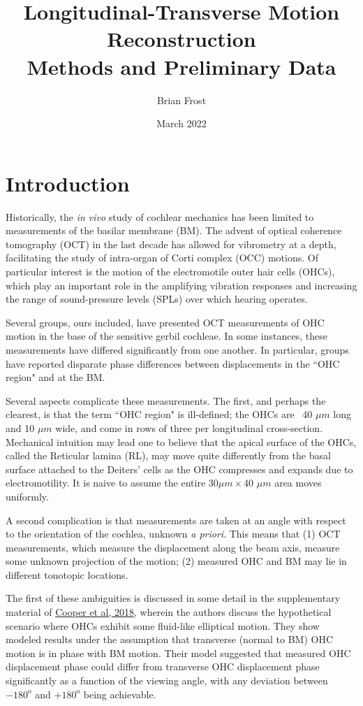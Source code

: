\documentclass{article}
\title{Longitudinal-Transverse Motion Reconstruction \\ Methods and Preliminary Data}
\author{Brian Frost}
\date{March 2022}
\begin{document}
\maketitle

\section{Introduction}
\par{Historically, the \textit{in vivo} study of cochlear mechanics has been limited to measurements of the basilar membrane (BM). The advent of optical coherence tomography (OCT) in the last decade has allowed for vibrometry at a depth, facilitating the study of intra-organ of Corti complex (OCC) motions. Of particular interest is the motion of the electromotile outer hair cells (OHCs), which play an important role in the amplifying vibration responses and increasing the range of sound-pressure levels (SPLs) over which hearing operates.}
\par{Several groups, ours included, have presented OCT measurements of OHC motion in the base of the sensitive gerbil cochleae. In some instances, these measurements have differed significantly from one another. In particular, groups have reported disparate phase differences between displacements in the ``OHC region" and at the BM.}
\par{Several aspects complicate these measurements. The first, and perhaps the clearest, is that the term ``OHC region" is ill-defined; the OHCs are ~40 $\mu m$ long and 10 $\mu m$ wide, and come in rows of three per longitudinal cross-section. Mechanical intuition may lead one to believe that the apical surface of the OHCs, called the Reticular lamina (RL), may move quite differently from the basal surface attached to the Deiters' cells as the OHC compresses and expands due to electromotility. It is naive to assume the entire 30$\mu m\times$40 $\mu m$ area moves uniformly.}
\par{A second complication is that measurements are taken at an angle with respect to the orientation of the cochlea, unknown \textit{a priori}. This means that (1) OCT measurements, which measure the displacement along the beam axis, measure some unknown projection of the motion; (2) measured OHC and BM may lie in different tonotopic locations.}
\par{The first of these ambiguities is discussed in some detail in the supplementary material of \href{https://www.nature.com/articles/s41467-018-05483-z}{Cooper et al, 2018}, wherein the authors discuss the hypothetical scenario where OHCs exhibit some fluid-like elliptical motion. They show modeled results under the assumption that transverse (normal to BM) OHC motion is in phase with BM motion. Their model suggested that measured OHC displacement phase could differ from transverse OHC displacement phase significantly as a function of the viewing angle, with any deviation between $-180^\text{o}$ and $+180^\text{o}$ being achievable.}
\end{document}
